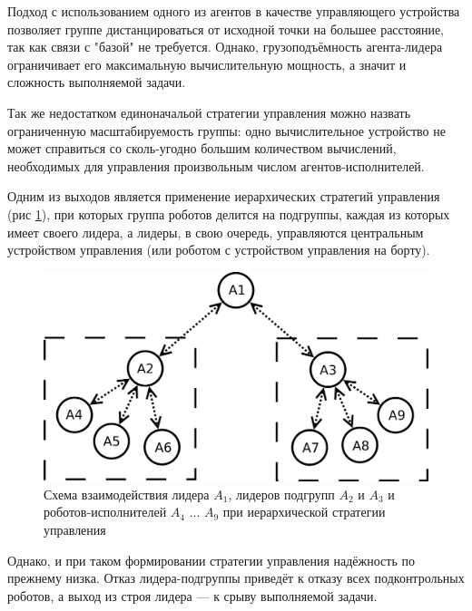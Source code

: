 \documentclass[a4paper, 14pt]{extarticle}
\begin{document}
Подход с использованием одного из агентов в качестве управляющего устройства позволяет группе дистанцироваться от исходной точки на большее расстояние, так как связи с "базой" не требуется. Однако, грузоподъёмность агента-лидера ограничивает его максимальную вычислительную мощность, а значит и сложность выполняемой задачи. \par
Так же недостатком единоначальой стратегии управления можно назвать ограниченную масштабируемость группы: одно вычислительное устройство не может справиться со сколь-угодно большим количеством вычислений, необходимых для управления произвольным числом агентов-исполнителей. \par
Одним из выходов является применение иерархических стратегий управления (рис \ref{fig:centr-platoon}), при которых группа роботов делится на подгруппы, каждая из которых имеет своего лидера, а лидеры, в свою очередь, управляются центральным устройством управления (или роботом с устройством управления на борту). \par
\begin{figure}[!htbp]
	\centering
	\includegraphics[width=0.9\linewidth]{others/centr-platoon}
	\caption{Схема взаимодействия лидера $A_1$, лидеров подгрупп $A_2$ и $A_3$ и роботов-исполнителей $A_4$ ... $A_9$ при иерархической стратегии управления}
	\label{fig:centr-platoon}
\end{figure}
Однако, и при таком формировании стратегии управления надёжность по прежнему низка. Отказ лидера-подгруппы приведёт к отказу всех подконтрольных роботов, а выход из строя лидера — к срыву выполняемой задачи.
\end{document}
